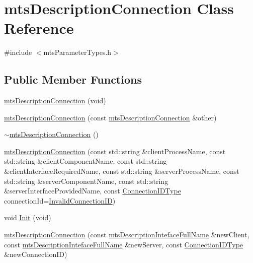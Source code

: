 \hypertarget{classmts_description_connection}{\section{mts\-Description\-Connection Class Reference}
\label{classmts_description_connection}
}


{\ttfamily \#include $<$mts\-Parameter\-Types.\-h$>$}

\subsection*{Public Member Functions}
\begin{DoxyCompactItemize}
\item 
\hyperlink{classmts_description_connection_ab51d91468f65fbe0b6046a71c839f2a4}{mts\-Description\-Connection} (void)
\item 
\hyperlink{classmts_description_connection_a6896ac7072537d7dbf998beac7288326}{mts\-Description\-Connection} (const \hyperlink{classmts_description_connection}{mts\-Description\-Connection} \&other)
\item 
\hyperlink{classmts_description_connection_a01b7ca5d77c59e945b815b69a3cbed87}{$\sim$mts\-Description\-Connection} ()
\item 
\hyperlink{classmts_description_connection_ab772dfaa64efa020fe1fafcbffe0374d}{mts\-Description\-Connection} (const std\-::string \&client\-Process\-Name, const std\-::string \&client\-Component\-Name, const std\-::string \&client\-Interface\-Required\-Name, const std\-::string \&server\-Process\-Name, const std\-::string \&server\-Component\-Name, const std\-::string \&server\-Interface\-Provided\-Name, const \hyperlink{mts_forward_declarations_8h_ad3543bb11742e1766374ec96016d6547}{Connection\-I\-D\-Type} connection\-Id=\hyperlink{mts_forward_declarations_8h_afa0f9196284a3cea6a91094a0f45209e}{Invalid\-Connection\-I\-D})
\item 
void \hyperlink{classmts_description_connection_a9baec37ea80d73f56a523c4621fb21fe}{Init} (void)
\item 
\hyperlink{classmts_description_connection_ad0d50b7d9f4c700eb95dbf09ecf813b1}{mts\-Description\-Connection} (const \hyperlink{classmts_description_inteface_full_name}{mts\-Description\-Inteface\-Full\-Name} \&new\-Client, const \hyperlink{classmts_description_inteface_full_name}{mts\-Description\-Inteface\-Full\-Name} \&new\-Server, const \hyperlink{mts_forward_declarations_8h_ad3543bb11742e1766374ec96016d6547}{Connection\-I\-D\-Type} \&new\-Connection\-I\-D)

\end{DoxyCompactItemize}
